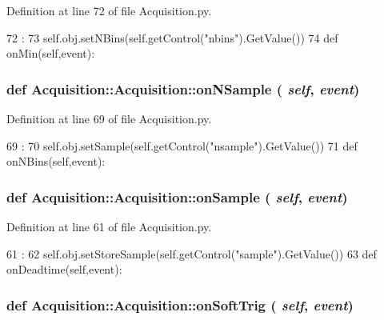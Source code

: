 Definition at line 72 of file Acquisition.py.


\begin{DoxyCode}
72                            :
73         self.obj.setNBins(self.getControl("nbins").GetValue())  
74 
    def onMin(self,event):
\end{DoxyCode}
\hypertarget{classAcquisition_1_1Acquisition_ac17393aa0cb7b6d48c482820ac4ecd26}{
\subsubsection[{onNSample}]{\setlength{\rightskip}{0pt plus 5cm}def Acquisition::Acquisition::onNSample ( {\em self}, \/   {\em event})}}
\label{classAcquisition_1_1Acquisition_ac17393aa0cb7b6d48c482820ac4ecd26}


Definition at line 69 of file Acquisition.py.


\begin{DoxyCode}
69                              :
70         self.obj.setSample(self.getControl("nsample").GetValue()) 
71 
    def onNBins(self,event):
\end{DoxyCode}
\hypertarget{classAcquisition_1_1Acquisition_ac06fcb6d14ab4269f58f50cfde00283f}{
\subsubsection[{onSample}]{\setlength{\rightskip}{0pt plus 5cm}def Acquisition::Acquisition::onSample ( {\em self}, \/   {\em event})}}
\label{classAcquisition_1_1Acquisition_ac06fcb6d14ab4269f58f50cfde00283f}


Definition at line 61 of file Acquisition.py.


\begin{DoxyCode}
61                             :
62         self.obj.setStoreSample(self.getControl("sample").GetValue())
63 
    def onDeadtime(self,event):
\end{DoxyCode}
\hypertarget{classAcquisition_1_1Acquisition_a5f7822cf53373ff7405944f1d9861759}{
\subsubsection[{onSoftTrig}]{\setlength{\rightskip}{0pt plus 5cm}def Acquisition::Acquisition::onSoftTrig ( {\em self}, \/   {\em event})}}
\label{classAcquisition_1_1Acquisition_a5f7822cf53373ff7405944f1d9861759}


